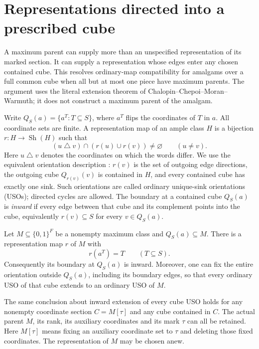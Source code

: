 \section{Representations directed into a prescribed cube}
\label{sec:maximum-cube-inward}

A maximum parent can supply more than an unspecified representation of
its marked section. It can supply a representation whose edges enter any
chosen contained cube. This resolves ordinary-map compatibility for
amalgams over a full common cube when all but at most one piece have
maximum parents. The argument uses the literal extension theorem of
Chalopin--Chepoi--Moran--Warmuth; it does not construct a maximum parent
of the amalgam.

Write $Q_S(a)=\{a^T:T\subseteq S\}$, where $a^T$ flips the coordinates
of $T$ in $a$. All coordinate sets are finite. A representation map of
an ample class $H$ is a bijection $r:H\to\operatorname{Sh}(H)$ such that
\[
 (u\mathbin\triangle v)\cap(r(u)\cup r(v))\ne\varnothing
 \qquad(u\ne v).
\]
Here $u\mathbin\triangle v$ denotes the coordinates on which the words
differ. We use the equivalent orientation description
\cite[Theorem~6.8]{ChalopiChepoiMoran22}: $r(v)$ is the set of outgoing
edge directions, the outgoing cube $Q_{r(v)}(v)$ is contained in $H$,
and every contained cube has exactly one sink. Such orientations are
called ordinary unique-sink orientations (USOs); directed cycles are allowed. The boundary at a
contained cube $Q_S(a)$ is \emph{inward} if every edge between that cube
and its complement points into the cube, equivalently
$r(v)\subseteq S$ for every $v\in Q_S(a)$.

\begin{theorem}
\label{thm:maximum-cube-inward}
Let $M\subseteq\{0,1\}^F$ be a nonempty maximum class and
$Q_S(a)\subseteq M$. There is a representation map $r$ of $M$ with
\begin{equation}
 r(a^T)=T\qquad(T\subseteq S).
 \label{eq:maximum-cube-inward-distance}
\end{equation}
Consequently its boundary at $Q_S(a)$ is inward.
Moreover, one can fix the entire orientation outside $Q_S(a)$, including
its boundary edges, so that every ordinary USO of that cube extends to
an ordinary USO of $M$.

The same conclusion about inward extension of every cube USO holds for
any nonempty coordinate section $C=M[\tau]$ and any cube contained in
$C$. The actual parent $M$, its rank, its auxiliary coordinates and its
mark $\tau$ can all be retained. Here $M[\tau]$ means fixing an
auxiliary coordinate set to $\tau$ and deleting those fixed coordinates.
The representation of $M$ may be chosen anew.
\end{theorem}

